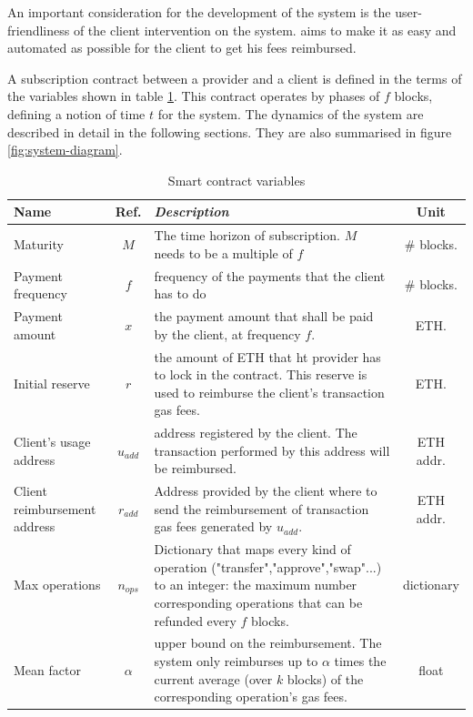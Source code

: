 An important consideration for the development of the system is the user-friendliness of the client intervention on the system. {\projectName} aims to make it as easy and automated as possible for the client to get his fees reimbursed.

A {\projectName} subscription contract between a provider and a client is defined in the terms of the variables shown in table \ref{tab:variables}. This contract operates by phases of $f$ blocks, defining a notion of time $t$ for the system. The dynamics of the system are described in detail in the following sections. They are also summarised in figure \ref{fig:system-diagram}.


\begin{table}[htbp]
\caption{Smart contract variables}
\begin{center}
\begin{tabular}{|l|c|p{10cm}|c|}
\hline
\textbf{Name} & Ref.&  \textbf{\textit{Description}} & Unit \\
\hline
Maturity & $M$ & The time horizon of subscription. $M$ needs to be a multiple of $f$ & \# blocks. \\
Payment frequency & $f$ & frequency of the payments that the client has to do & \# blocks.\\
Payment amount & $x$ & the payment amount that shall be paid by the client, at frequency $f$. & ETH.\\
Initial reserve & $r$ & the amount of ETH that ht provider has to lock in the contract. This reserve is used to reimburse the client's transaction gas fees. & ETH. \\
Client's usage address  & $u_{add}$ & address registered by the client. The transaction performed by this address will be reimbursed. & ETH addr. \\
Client reimbursement address & $r_{add}$ & Address provided by the client where to send the reimbursement of transaction gas fees generated by $u_{add}$. & ETH addr.\\
Max operations & $n_{ops}$ & Dictionary that maps every kind of operation ("transfer","approve","swap"...) to an integer: the maximum number corresponding operations that can be refunded every $f$ blocks. & dictionary \\

Mean factor & $\alpha$ & upper bound on the reimbursement. The system only reimburses up to $\alpha$ times the current average  (over $k$ blocks) of the corresponding operation's gas fees. & float\\
\hline
\end{tabular}
\label{tab:variables}
\end{center}
\end{table}

